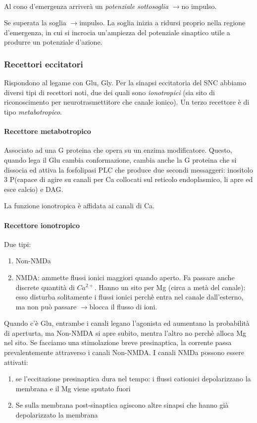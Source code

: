 \documentclass[a4paper,12pt]{article}
\newcommand{\lfreccia}{\ensuremath{\longrightarrow}}
\begin{document}
\paragraph{}
Al cono d'emergenza arriverà un \emph{potenziale sottosoglia} \lfreccia no impulso. 

Se superata la soglia \lfreccia impulso. La soglia inizia a ridursi proprio nella regione d'emergenza, in cui si incrocia un'ampiezza del potenziale sinaptico utile a produrre un potenziale d'azione.

\subsubsection{Recettori eccitatori}
Rispondono al legame con Glu, Gly. Per la sinapsi eccitatoria del SNC abbiamo diversi tipi di recettori noti, due dei quali sono \emph{ionotropici} (sia sito di riconoscimento per neurotrasmettitore che canale ionico). Un terzo recettore è di tipo \emph{metabotropico}.
\paragraph{Recettore metabotropico}
Associato ad una G proteina che opera su un enzima modificatore. Questo, quando lega il Glu cambia conformazione, cambia anche la G proteina che si dissocia ed attiva la fosfolipasi PLC che produce due secondi messaggeri: inositolo 3 P(capace di agire su canali per Ca collocati sul reticolo endoplasmico, li apre ed esce calcio) e DAG.

La funzione ionotropica è affidata ai canali di Ca.

\paragraph{Recettore ionotropico}
Due tipi:
\begin{enumerate}
\item{Non-NMDa}
\item{NMDA: ammette flussi ionici maggiori quando aperto. Fa passare anche discrete quantità di $Ca^{2+}$. Hanno un sito per Mg (circa a metà del canale): esso disturba solitamente i flussi ionici perchè entra nel canale dall'esterno, ma non può passare \lfreccia blocca il flusso di ioni. }
\end{enumerate}

Quando c'è Glu, entrambe i canali legano l'agonista ed aumentano la probabilità di aperturta, ma Non-NMDA si apre subito, mentra l'altro no perchè alloca Mg nel sito. Se facciamo una stimolazione breve presinaptica, la corrente passa prevalentemente attraverso i canali Non-NMDA. I canali NMDa possono essere attivati:
\begin{enumerate} 
\item{se l'eccitazione presinaptica dura nel tempo: i flussi cationici depolarizzano la membrana e il Mg viene sputato fuori}
\item{Se sulla membrana post-sinaptica agiscono altre sinapsi che hanno già depolarizzato la membrana}
\end{enumerate}
\end{document}
